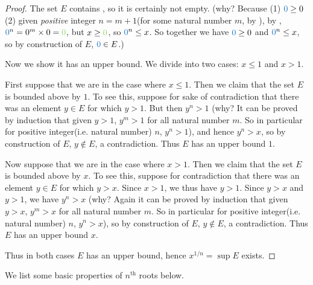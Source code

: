 \begin{proof}
The set \(E\) contains , so it is certainly not empty.
(why? Because (1) \(\BLUE{0} \ge 0\) (2) given \emph{positive} integer \(n = m + 1\)(for some natural number \(m\), by ), by , \(\BLUE{0}^n = 0^m \X 0 = \GREEN{0}\), but \(x \ge \GREEN{0}\), so \(\BLUE{0}^n \le x\).
So together we have \(\BLUE{0} \ge 0\) and \(\BLUE{0}^n \le x\), so by construction of \(E\), \(\BLUE{0} \in E\).)

Now we show it has an upper bound.
We divide into two cases: \(x \le 1\) and \(x > 1\).

First suppose that we are in the case where \(x \le 1\).
Then we claim that the set \(E\) is bounded above by \(1\).
To see this, suppose for sake of contradiction that there was an element \(y \in E\) for which \(y > 1\). But then \(y^n > 1\)
(why? It can be proved by induction that given \(y > 1\), \(y^m > 1\) for all natural number \(m\).
So in particular for positive integer(i.e. natural number) \(n\), \(y^n > 1\)),
and hence \(y^n > x\), so by construction of \(E\), \(y \notin E\), a contradiction.
Thus \(E\) has an upper bound \(1\).

Now suppose that we are in the case where  \(x > 1\). Then we claim that the set \(E\) is bounded above by \(x\).
To see this, suppose for contradiction that there was an element \(y \in E\) for which \(y > x\).
Since \(x > 1\), we thus have \(y > 1\). Since \(y > x\) and \(y > 1\), we have \(y^n > x\)
(why? Again it can be proved by induction that given \(y > x\), \(y^m > x\) for all natural number \(m\).
So in particular for positive integer(i.e. natural number) \(n\), \(y^n > x\)),
so by construction of \(E\), \(y \notin E\), a contradiction.
Thus \(E\) has an upper bound \(x\).

Thus in both cases \(E\) has an upper bound, hence \(x^{1/n} = \sup E\) exists.
\end{proof}

We list some basic properties of \(n^{\text{th}}\) roots below.

